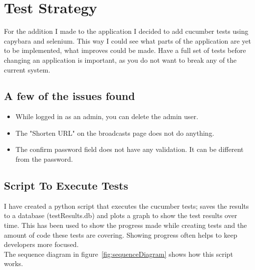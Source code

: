 \documentclass[10pt,a4paper,titlepage]{article}
\begin{document}
\section{Test Strategy}
For the addition I made to the application I decided to add cucumber tests using capybara and selenium. This way I could see what parts of the application are yet to be implemented, what improves could be made. Have a full set of tests before changing an application is important, as you do not want to break any of the current system. 

 

\subsection{A few of the issues found}
\begin{itemize}
\item While logged in as an admin, you can delete the admin user.
\item The "Shorten URL" on the broadcasts page does not do anything.
\item The confirm password field does not have any validation. It can be different from the password.
\end{itemize}


\subsection{Script To Execute Tests}
I have created a python script that executes the cucumber tests; saves the results to a database (testResults.db) and  plots a graph to show the test results over time. This has been used to show the progress made while creating tests and the amount of code these tests are covering. Showing progress often helps to keep developers more focused.\\

The sequence diagram in figure~\ref{fig:sequenceDiagram} shows how this script works.
\end{document}

